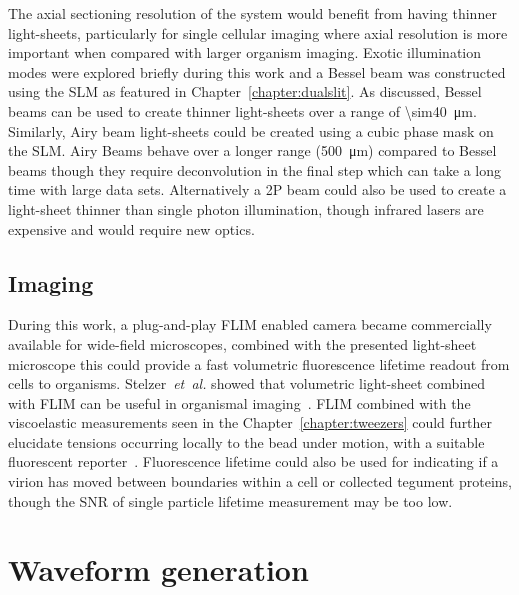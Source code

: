 The axial sectioning resolution of the system would benefit from having thinner light-sheets, particularly for single cellular imaging where axial resolution is more important when compared with larger organism imaging.
Exotic illumination modes were explored briefly during this work and a Bessel beam was constructed using the \gls{SLM} as featured in Chapter~\ref{chapter:dualslit}.
As discussed, Bessel beams can be used to create thinner light-sheets over a range of \SI{\sim40}{\micro\meter}.
Similarly, Airy beam light-sheets could be created using a cubic phase mask on the \gls{SLM}.
Airy Beams behave over a longer range (\SI{500}{\micro\meter}) compared to Bessel beams though they require deconvolution in the final step which can take a long time with large data sets.
Alternatively a \gls{2P} beam could also be used to create a light-sheet thinner than single photon illumination, though infrared lasers are expensive and would require new optics.

\subsection{Imaging}

During this work, a plug-and-play \gls{FLIM} enabled camera became commercially available for wide-field microscopes, combined with the presented light-sheet microscope this could provide a fast volumetric fluorescence lifetime readout from cells to organisms.
Stelzer~\emph{et~al.} showed that volumetric light-sheet combined with FLIM can be useful in organismal imaging~\cite{gregerThreedimensionalFluorescenceLifetime2011a}.
FLIM combined with the viscoelastic measurements seen in the Chapter~\ref{chapter:tweezers} could further elucidate tensions occurring locally to the bead under motion, with a suitable fluorescent reporter~\cite{colomFluorescentMembraneTension2018}.
Fluorescence lifetime could also be used for indicating if a \gls{virion} has moved between boundaries within a cell or collected tegument proteins, though the \gls{SNR} of single particle lifetime measurement may be too low.

\section{Waveform generation}

